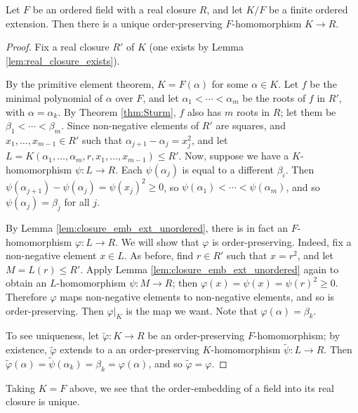 \begin{lemma}
  \label{lem:closure_emb_ext}
  Let $F$ be an ordered field with a real closure $R$, and let $K/F$ be a finite ordered extension. Then there is a unique order-preserving $F$-homomorphism $K\to R$.
\end{lemma}
\begin{proof}
  Fix a real closure $R'$ of $K$ (one exists by Lemma \ref{lem:real_closure_exists}).
  
  By the primitive element theorem, $K=F(\alpha)$ for some $\alpha\in K$. Let $f$ be the minimal polynomial of $\alpha$ over $F$, and let $\alpha_1<\cdots<\alpha_m$ be the roots of $f$ in $R'$, with $\alpha=\alpha_k$. By Theorem \ref{thm:Sturm}, $f$ also has $m$ roots in $R$; let them be $\beta_1<\cdots<\beta_m$. Since non-negative elements of $R'$ are squares, and $x_1,\dots,x_{m-1}\in R'$ such that $\alpha_{j+1}-\alpha_j=x_j^2$, and let $L=K(\alpha_1,\dots,\alpha_m,r,x_1,\dots,x_{m-1})\leq R'$. Now, suppose we have a $K$-homomorphism $\psi:L\to R$. Each $\psi(\alpha_j)$ is equal to a different $\beta_i$. Then $\psi(\alpha_{j+1})-\psi(\alpha_j)=\psi(x_j)^2\geq0$, so $\psi(\alpha_1)<\cdots<\psi(\alpha_m)$, and so $\psi(\alpha_j)=\beta_j$ for all $j$.

  By Lemma \ref{lem:closure_emb_ext_unordered}, there is in fact an $F$-homomorphism $\varphi:L\to R$. We will show that $\varphi$ is order-preserving. Indeed, fix a non-negative element $x\in L$. As before, find $r\in R'$ such that $x=r^2$, and let $M=L(r)\leq R'$. Apply Lemma \ref{lem:closure_emb_ext_unordered} again to obtain an $L$-homomorphism $\psi:M\to R$; then $\varphi(x)=\psi(x)=\psi(r)^2\geq0$. Therefore $\varphi$ maps non-negative elements to non-negative elements, and so is order-preserving. Then $\varphi|_K$ is the map we want. Note that $\varphi(\alpha)=\beta_k$.

  To see uniqueness, let $\tilde\varphi:K\to R$ be an order-preserving $F$-homomorphism; by existence, $\tilde\varphi$ extends to a an order-preserving $K$-homomorphism $\tilde\psi:L\to R$. Then $\tilde\varphi(\alpha)=\tilde\psi(\alpha_k)=\beta_k=\varphi(\alpha)$, and so $\tilde\varphi=\varphi$.
\end{proof}

Taking $K=F$ above, we see that the order-embedding of a field into its real closure is unique.

